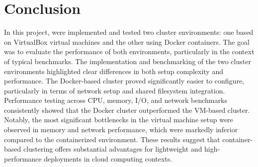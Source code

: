 \section{Conclusion}

In this project, were implemented and tested two cluster environments: one based on VirtualBox virtual machines and the other using Docker containers. The goal was to evaluate the performance of both environments, particularly in the context of typical benchmarks. The implementation and benchmarking of the two cluster environments highlighted clear differences in both setup complexity and performance. The Docker-based cluster proved significantly easier to configure, particularly in terms of network setup and shared filesystem integration. Performance testing across CPU, memory, I/O, and network benchmarks consistently showed that the Docker cluster outperformed the VM-based cluster. Notably, the most significant bottlenecks in the virtual machine setup were observed in memory and network performance, which were markedly inferior compared to the containerized environment. These results suggest that container-based clustering offers substantial advantages for lightweight and high-performance deployments in cloud computing contexts.

